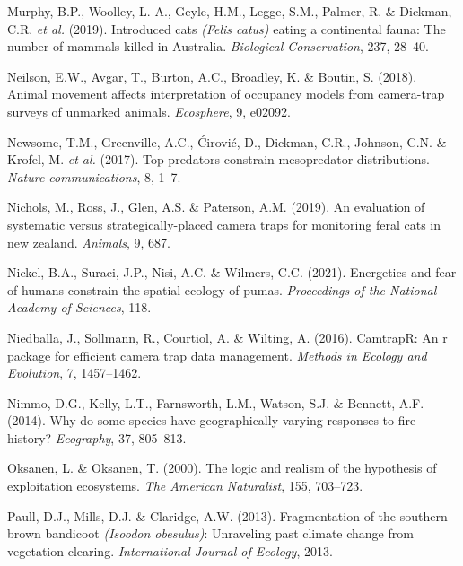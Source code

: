 \documentclass[11pt,a4paper,titlepage,twoside,openright]{style/unimelbthesis}
\begin{document}
\begin{mainmatter}
\leavevmode\hypertarget{ref-murphy2019introduced}{}%
Murphy, B.P., Woolley, L.-A., Geyle, H.M., Legge, S.M., Palmer, R. \& Dickman, C.R. \emph{et al.} (2019). Introduced cats \emph{(Felis catus)} eating a continental fauna: The number of mammals killed in Australia. \emph{Biological Conservation}, 237, 28--40.

\leavevmode\hypertarget{ref-neilson2018animal}{}%
Neilson, E.W., Avgar, T., Burton, A.C., Broadley, K. \& Boutin, S. (2018). Animal movement affects interpretation of occupancy models from camera-trap surveys of unmarked animals. \emph{Ecosphere}, 9, e02092.

\leavevmode\hypertarget{ref-newsome2017top}{}%
Newsome, T.M., Greenville, A.C., Ćirović, D., Dickman, C.R., Johnson, C.N. \& Krofel, M. \emph{et al.} (2017). Top predators constrain mesopredator distributions. \emph{Nature communications}, 8, 1--7.

\leavevmode\hypertarget{ref-nichols2019evaluation}{}%
Nichols, M., Ross, J., Glen, A.S. \& Paterson, A.M. (2019). An evaluation of systematic versus strategically-placed camera traps for monitoring feral cats in new zealand. \emph{Animals}, 9, 687.

\leavevmode\hypertarget{ref-nickel2021energetics}{}%
Nickel, B.A., Suraci, J.P., Nisi, A.C. \& Wilmers, C.C. (2021). Energetics and fear of humans constrain the spatial ecology of pumas. \emph{Proceedings of the National Academy of Sciences}, 118.

\leavevmode\hypertarget{ref-niedballa2016}{}%
Niedballa, J., Sollmann, R., Courtiol, A. \& Wilting, A. (2016). CamtrapR: An r package for efficient camera trap data management. \emph{Methods in Ecology and Evolution}, 7, 1457--1462.

\leavevmode\hypertarget{ref-nimmo2014why}{}%
Nimmo, D.G., Kelly, L.T., Farnsworth, L.M., Watson, S.J. \& Bennett, A.F. (2014). Why do some species have geographically varying responses to fire history? \emph{Ecography}, 37, 805--813.

\leavevmode\hypertarget{ref-oksanen2000logic}{}%
Oksanen, L. \& Oksanen, T. (2000). The logic and realism of the hypothesis of exploitation ecosystems. \emph{The American Naturalist}, 155, 703--723.

\leavevmode\hypertarget{ref-paull2013fragmentation}{}%
Paull, D.J., Mills, D.J. \& Claridge, A.W. (2013). Fragmentation of the southern brown bandicoot \emph{(Isoodon obesulus)}: Unraveling past climate change from vegetation clearing. \emph{International Journal of Ecology}, 2013.


\end{mainmatter}
\end{document}
